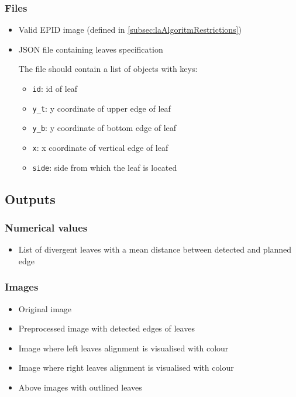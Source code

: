 \subsubsection{Files}

\begin{itemize}

    \item Valid EPID image (defined in \autoref{subsec:laAlgoritmRestrictions})

    \item JSON file containing leaves specification

    The file should contain a list of objects with keys:

    \begin{itemize}
        \item \verb|id|: id of leaf
        \item \verb|y_t|: y coordinate of upper edge of leaf
        \item \verb|y_b|: y coordinate of bottom edge of leaf
        \item \verb|x|: x coordinate of vertical edge of leaf
        \item \verb|side|: side from which the leaf is located
    \end{itemize}

\end{itemize}

\subsection{Outputs} \label{sec:laAnalysisOutputs}

\subsubsection{Numerical values}

\begin{itemize}

    \item List of divergent leaves with a mean distance between detected and planned edge
    
\end{itemize}

\subsubsection{Images}

\begin{itemize}

    \item Original image

    \item Preprocessed image with detected edges of leaves

    \item Image where left leaves alignment is visualised with colour

    \item Image where right leaves alignment is visualised with colour

    \item Above images with outlined leaves
    
\end{itemize}

